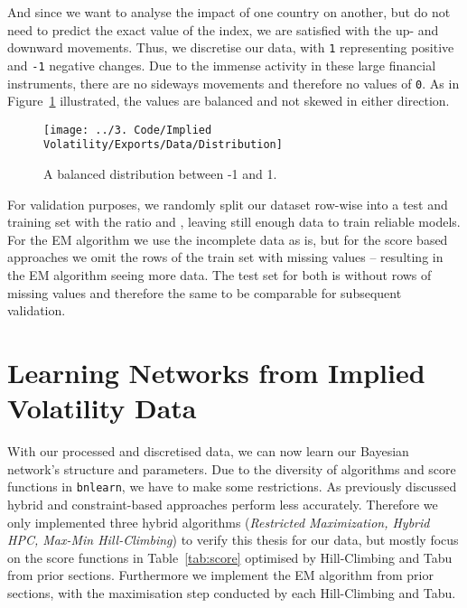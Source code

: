 \documentclass[twoside,twocolumn]{article}
\begin{document}
And since we want to analyse the impact of one country on another, but do not need to predict the exact value of the index, we are satisfied with the up- and downward movements. Thus, we discretise our data, with \texttt{1} representing positive and \texttt{-1}  negative changes. Due to the immense activity in these large financial instruments, there are no sideways movements and therefore no  values of \texttt{0}. As in Figure~\ref{fig:balanced} illustrated, the values are balanced and not skewed in either direction.

\begin{figure}[H]
\centering
  \texttt{[image: ../3. Code/Implied Volatility/Exports/Data/Distribution]}
  \caption[Distribution of binary data]{  A balanced distribution between -1 and 1.}
  \label{fig:balanced}
\end{figure}
For validation purposes, we randomly split our dataset row-wise into a test  and  training set with the ratio  and , leaving still enough data to train reliable models. For the EM algorithm we use the incomplete data as is, but for the score based approaches we omit the rows of the train set with missing values -- resulting in the EM algorithm seeing  more data. The test set for both is without rows of missing values and therefore the same to be comparable for subsequent validation. \cite{Kauermann2021} \cite{Hastie2009}


\section{Learning Networks from Implied Volatility Data}
With our processed and discretised data, we can now learn our Bayesian network's structure and parameters. Due to the diversity of algorithms and score functions in \texttt{bnlearn}, we have to make some restrictions. As previously discussed hybrid and constraint-based approaches perform less accurately. \cite{Scutari2019}  Therefore we only implemented three hybrid algorithms (\textit{Restricted Maximization, Hybrid HPC, Max-Min Hill-Climbing}) to verify this thesis for our data, but mostly focus on the score functions in Table~\ref{tab:score} optimised by Hill-Climbing and Tabu from prior sections. Furthermore we implement the EM algorithm from prior sections, with the maximisation step conducted by each Hill-Climbing and Tabu.
\end{document}
